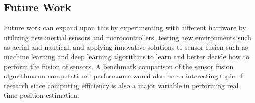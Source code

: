 \subsection{Future Work}

Future work can expand upon this by experimenting with different hardware by utilizing new inertial sensors and microcontrollers, testing new environments such as aerial and nautical, and applying innovative solutions to sensor fusion such as machine learning and deep learning algorithms to learn and better decide how to perform the fusion of sensors. A benchmark comparison of the sensor fusion algorithms on computational performance would also be an interesting topic of research since computing efficiency is also a major variable in performing real time position estimation.
